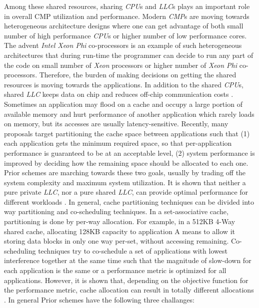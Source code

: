 \indent Among these shared resources, sharing \textit{CPU}s and \textit{LLC}s plays an important role in overall CMP utilization and performance. Modern \textit{CMP}s are moving towards heterogeneous architecture designs where one can get advantage of both small number of high performance \textit{CPU}s or higher number of low performance cores. The advent \textit{Intel Xeon Phi} co-processors is an example of such heterogeneous architectures that during run-time the programmer can decide to run any part of the code on small number of \textit{Xeon} processors or higher number of \textit{Xeon Phi} co-processors. Therefore, the burden of making decisions on getting the shared resources is moving towards the applications. In addition to the shared \textit{CPU}s, shared \textit{LLC} keeps data on chip and reduces off-chip communication costs \cite{liu2004organizing}. Sometimes an application may flood on a cache and occupy a large portion of available memory and hurt performance of another application which rarely loads on memory, but its accesses are usually latency-sensitive. Recently, many proposals target partitioning the cache space between applications such that (1) each application gets the minimum required space, so that per-application performance is guaranteed to be at an acceptable level, (2) system performance is improved by deciding how the remaining space should be allocated to each one. \\
\indent Prior schemes \cite{zhuravlev2010addressing, qureshi2006utility, lin2008gaining, iyer2004cqos, liu2004organizing, rafique2006architectural, jiang2008analysis, yekkehkhany2017gb, xie2016scheduling} are marching towards these two goals, usually by trading off the system complexity and maximum system utilization. It is shown that neither a pure private \textit{LLC}, nor a pure shared \textit{LLC}, can provide optimal performance for different workloads \cite{cho2006managing}. In general, cache partitioning techniques can be divided into way partitioning and co-scheduling techniques. In a set-associative cache, partitioning is done by per-way allocation. For example, in a 512KB 4-Way shared cache, allocating 128KB capacity to application A means to allow it storing data blocks in only one way per-set, without accessing remaining. Co-scheduling techniques try to co-schedule a set of applications with lowest interference together at the same time such that the magnitude of slow-down for each application is the same or a performance metric is optimized for all applications. However, it is shown that, depending on the objective function for the performance metric, cache allocation can result in totally different allocations \cite{hsu2006communist}. In general Prior schemes have the following three challanges:\\
